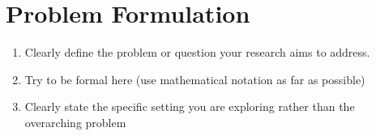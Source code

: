 \section{Problem Formulation}

\begin{enumerate}
    \item Clearly define the problem or question your research aims to address.
    \item Try to be formal here (use mathematical notation as far as possible)
    \item Clearly state the specific setting you are exploring rather than the overarching problem
\end{enumerate}

